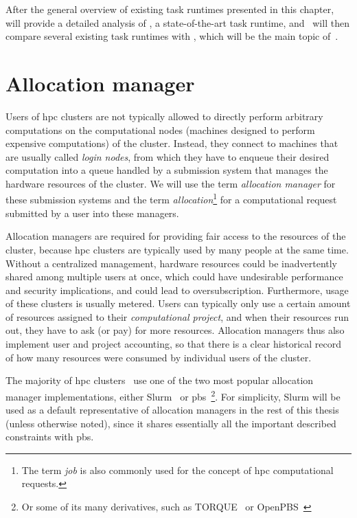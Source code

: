 After the general overview of existing task runtimes presented in this chapter,~ will
provide a detailed analysis of \dask{}, a state-of-the-art task runtime,
and~ will then compare several existing task runtimes with \hyperqueue{}, which will be the main
topic of~.

\section{Allocation manager}
\label{challenge:allocation-manager}
Users of \gls{hpc} clusters are not typically allowed to directly perform
arbitrary computations on the computational nodes (machines designed to perform expensive
computations) of the cluster. Instead, they connect to machines that are usually called
\emph{login nodes}, from which they have to enqueue their desired computation into a queue
handled by a submission system that manages the hardware resources of the cluster. We will use the
term \emph{allocation manager} for these submission systems and the term
\emph{allocation}\footnote{The term \emph{job} is also commonly used for the concept of
\gls{hpc} computational requests.} for a computational request submitted by a
user into these managers.

Allocation managers are required for providing fair access to the resources of the cluster, because
\gls{hpc} clusters are typically used by many people at the same time. Without a
centralized management, hardware resources could be inadvertently shared among multiple users at
once, which could have undesirable performance and security implications, and could lead to
oversubscription. Furthermore, usage of these clusters is usually metered. Users can typically only
use a certain amount of resources assigned to their \emph{computational project}, and when their
resources run out, they have to ask (or pay) for more resources. Allocation managers thus also
implement user and project accounting, so that there is a clear historical record of how many
resources were consumed by individual users of the cluster.

The majority of \gls{hpc} clusters~\cite{slurm-schedmd} use one of the two
most popular allocation manager implementations, either Slurm~\cite{slurm} or
\gls{pbs}~\cite{pbs}\footnote{Or some of its many derivatives,
such as TORQUE~\cite{torque} or OpenPBS~\cite{openpbs}}. For simplicity,
Slurm will be used as a default representative of allocation managers in the rest of this thesis
(unless otherwise noted), since it shares essentially all the important described constraints with
\gls{pbs}.

